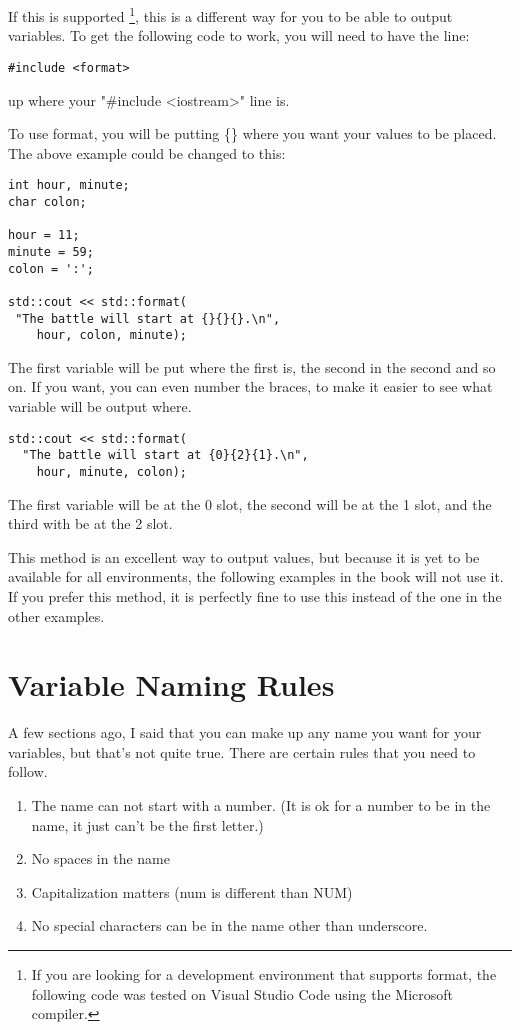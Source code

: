 If this is supported \footnote{If you are looking for a development environment that supports format, the following code 
was tested on Visual Studio Code using the Microsoft compiler.}, this is a different way for you to be able
to output variables. To get the following code to work,
you will need to have the line:
\begin{verbatim}
#include <format>  
\end{verbatim}
up where your "\#include \textless iostream\textgreater" line is.

To use format, you will be putting \{\} where you want your values
to be placed. The above example could be changed to this:
\begin{lstlisting}
int hour, minute;
char colon;

hour = 11;
minute = 59;
colon = ':';

std::cout << std::format(
 "The battle will start at {}{}{}.\n", 
    hour, colon, minute);
\end{lstlisting}
The first variable will be put where the first {} is, the second in
the second {} and so on. If you want, you can even number the 
braces, to make it easier to see what variable will be output where.
\begin{lstlisting}
std::cout << std::format(
  "The battle will start at {0}{2}{1}.\n", 
    hour, minute, colon);  
\end{lstlisting}
The first variable will be at the 0 slot, the second will be at the
1 slot, and the third with be at the 2 slot. 

This method is an excellent way to output values, but because it is yet to be available
for all environments, the following examples in the book will not use it. If you prefer this method, it is perfectly fine to use this instead of the one in the other examples.

\section{Variable Naming Rules}
A few sections ago, I said that you can make up any name you
want for your variables, but that's not quite true. There are certain rules that you need to follow.
\begin{enumerate}
    \item The name can not start with a number. (It is ok for a number to be in the name, it just can't be the first letter.)
    \item No spaces in the name
    \item Capitalization matters (num is different than NUM) 
    \item No special characters can be in the name other than underscore.
\end{enumerate}


